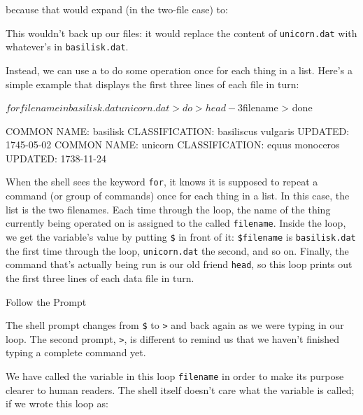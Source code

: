 because that would expand (in the two-file case) to:


This wouldn't back up our files: it would replace the content of
\texttt{unicorn.dat} with whatever's in \texttt{basilisk.dat}.

Instead, we can use a  to do some operation
once for each thing in a list. Here's a simple example that displays the
first three lines of each file in turn:

\begin{VerbIn}
$ for filename in basilisk.dat unicorn.dat
> do
>    head -3 $filename
> done
\end{VerbIn}

\begin{VerbOut}
COMMON NAME: basilisk
CLASSIFICATION: basiliscus vulgaris
UPDATED: 1745-05-02
COMMON NAME: unicorn
CLASSIFICATION: equus monoceros
UPDATED: 1738-11-24
\end{VerbOut}

When the shell sees the keyword \texttt{for}, it knows it is supposed to
repeat a command (or group of commands) once for each thing in a list.
In this case, the list is the two filenames. Each time through the loop,
the name of the thing currently being operated on is assigned to the
 called \texttt{filename}. Inside the
loop, we get the variable's value by putting \texttt{\$} in front of it:
\texttt{\$filename} is \texttt{basilisk.dat} the first time through the
loop, \texttt{unicorn.dat} the second, and so on. Finally, the command
that's actually being run is our old friend \texttt{head}, so this loop
prints out the first three lines of each data file in turn.

\begin{swcbox}{Follow the Prompt}

The shell prompt changes from \texttt{\$} to \texttt{\textgreater{}} and
back again as we were typing in our loop. The second prompt,
\texttt{\textgreater{}}, is different to remind us that we haven't
finished typing a complete command yet.

\end{swcbox}

We have called the variable in this loop \texttt{filename} in order to
make its purpose clearer to human readers. The shell itself doesn't care
what the variable is called; if we wrote this loop as:

